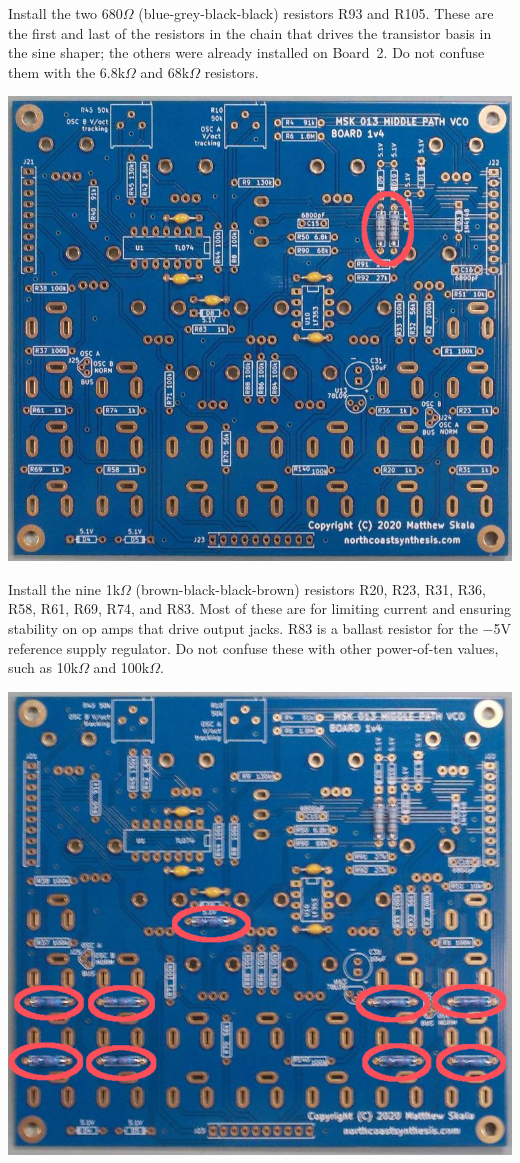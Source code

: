 \pagebreak

Install the two 680$\Omega$ (blue-grey-black-black) resistors R93 and R105.
These are the first and last of the resistors in the chain that drives the
transistor basis in the sine shaper; the others were already installed on
Board~2.  Do not confuse them with the 6.8k$\Omega$ and 68k$\Omega$
resistors.

\nopagebreak
\noindent\includegraphics[width=\linewidth]{res-680-1.jpg}

Install the nine 1k$\Omega$ (brown-black-black-brown) resistors R20, R23,
R31, R36, R58, R61, R69, R74, and R83.  Most of these are for limiting
current and ensuring stability on op amps that drive output jacks.  R83 is a
ballast resistor for the $-$5V reference supply regulator.  Do not confuse
these with other power-of-ten values, such as 10k$\Omega$ and 100k$\Omega$.

\nopagebreak
\noindent\includegraphics[width=\linewidth]{res-1k1.jpg}

